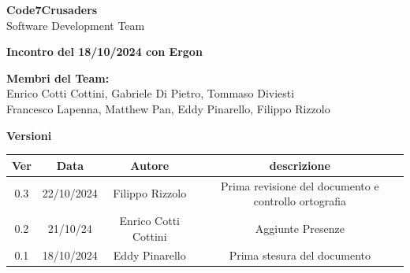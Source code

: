 \documentclass{article}
\begin{document}
\begin{titlepage}
    {\Huge \textbf{Code7Crusaders}}\\
    \vspace{0.5cm}
    {\Large Software Development Team}\\
    \vspace{2cm}
    
    {\large \textbf{Incontro del 18/10/2024 con Ergon}}\\
    \vspace{5cm}

    \textbf{Membri del Team:}\\
    Enrico Cotti Cottini, Gabriele Di Pietro, Tommaso Diviesti \\
    Francesco Lapenna, Matthew Pan, Eddy Pinarello, Filippo Rizzolo \\
    \vspace{0.5cm}
    
    \vspace{1cm}
\end{titlepage}

\begin{center}
    \textbf{Versioni}
    \\
    \begin{tabular}{|c|c|c|c|}
        \hline
        \textbf{Ver} & \textbf{Data} & \textbf{Autore} & \textbf{descrizione}\\
        \hline
        0.3 & 22/10/2024 & Filippo Rizzolo & Prima revisione del documento e controllo ortografia \\ 
        \hline
	    0.2 & 21/10/24 & Enrico Cotti Cottini & Aggiunte Presenze \\
	    \hline
        0.1 & 18/10/2024 & Eddy Pinarello & Prima stesura del documento \\ 
        \hline
    \end{tabular}
\end{center}

\newpage
\tableofcontents
\newpage

\end{document}
